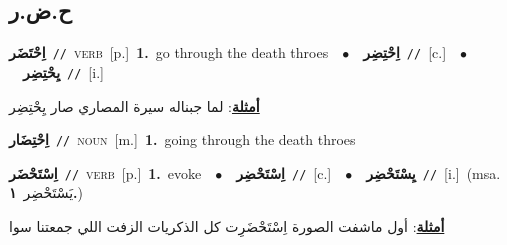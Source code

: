 \documentclass[10pt,a4paper,twoside]{article} %
\begin{document}
\begin{multicols}{2}
\vspace{-3mm}
\subsection*{\color{blue}\foreignlanguage{arabic}{ح.ض.ر}\color{blue}{}} 

{\setlength\topsep{0pt}\textbf{\foreignlanguage{arabic}{اِحْتَضَر}}\ {\color{gray}\texttt{//}\color{black}}\ \textsc{verb}\ [p.]\ \textbf{1.}~go through the death throes\ \ $\bullet$\ \ \setlength\topsep{0pt}\textbf{\foreignlanguage{arabic}{اِحْتِضِر}}\ {\color{gray}\texttt{//}\color{black}}\ [c.]\ \ $\bullet$\ \ \setlength\topsep{0pt}\textbf{\foreignlanguage{arabic}{يِحْتِضِر}}\ {\color{gray}\texttt{//}\color{black}}\ [i.]\  \begin{flushright}\color{gray}\foreignlanguage{arabic}{\textbf{\underline{\foreignlanguage{arabic}{أمثلة}}}: لما جبناله سيرة المصاري صار يِحْتِضِر}\end{flushright}\color{black}} \vspace{2mm}

{\setlength\topsep{0pt}\textbf{\foreignlanguage{arabic}{اِحْتِضَار}}\ {\color{gray}\texttt{//}\color{black}}\ \textsc{noun}\ [m.]\ \textbf{1.}~going through the death throes\ } \vspace{2mm}

{\setlength\topsep{0pt}\textbf{\foreignlanguage{arabic}{اِسْتَحْضَر}}\ {\color{gray}\texttt{//}\color{black}}\ \textsc{verb}\ [p.]\ \textbf{1.}~evoke\ \ $\bullet$\ \ \setlength\topsep{0pt}\textbf{\foreignlanguage{arabic}{اِسْتَحْضِر}}\ {\color{gray}\texttt{//}\color{black}}\ [c.]\ \ $\bullet$\ \ \setlength\topsep{0pt}\textbf{\foreignlanguage{arabic}{يِسْتَحْضِر}}\ {\color{gray}\texttt{//}\color{black}}\ [i.]\ \color{gray}(msa. \foreignlanguage{arabic}{يَسْتَحْضِر}~\foreignlanguage{arabic}{\textbf{١.}})\color{black}\  \begin{flushright}\color{gray}\foreignlanguage{arabic}{\textbf{\underline{\foreignlanguage{arabic}{أمثلة}}}: أول ماشفت الصورة اِسْتَحْضَرِت كل الذكريات الزفت اللي جمعتنا سوا}\end{flushright}\color{black}} \vspace{2mm}


\end{multicols}
\end{document}
